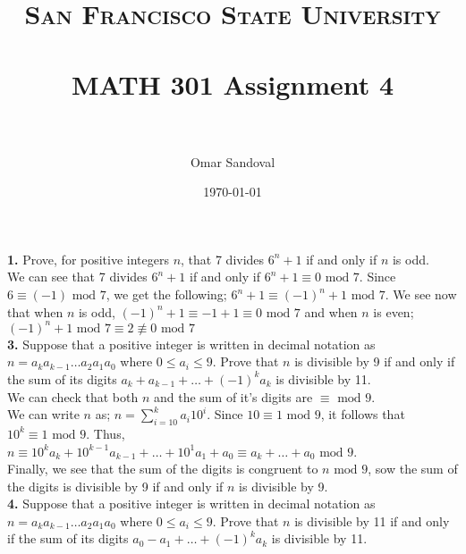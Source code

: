 \documentclass[paper=letter, fontsize=11pt]{scrartcl} %
\title{	
\normalfont \normalsize 
\textsc{San Francisco State University} \\ [25pt]
\horrule{0.5pt} \\[0.4cm] %
\huge MATH 301 Assignment 4  \\ %
\horrule{2pt} \\[0.5cm] %
}
\author{Omar Sandoval}
\date{\normalsize\today}
\begin{document}
\maketitle

\textbf{1.} Prove, for positive integers $n$, that 7 divides $6^n + 1$ if and only if $n$
is odd.
\\

We can see that 7 divides $6^n + 1$ if and only if $6^n + 1 \equiv 0 \text{ mod } 7$.
Since $6 \equiv (-1) \text{ mod } 7$, we get the following; $6^n + 1 \equiv (-1)^n + 1 \text{ mod } 7$.
We see now that when $n$ is odd, $(-1)^n + 1 \equiv -1 + 1 \equiv 0 \text{ mod } 7$ and when $n$
is even; $(-1)^n + 1 \text{ mod } 7 \equiv 2 \not\equiv 0 \text{ mod } 7$
\\

\textbf{3.} Suppose that a positive integer is written in decimal notation as 
$n=a_k a_{k-1} \dots a_2a_1a_0$ where $0 \le a_i \le 9$. Prove that $n$ is divisible by 
9 if and only if the sum of its digits $a_k + a_{k-1} + \dots + (-1)^k a_k$ is divisible 
by 11.
\\

We can check that both $n$ and the sum of it's digits are $\equiv \text{ mod } 9$. \\
We can write $n$ as; $n = \sum_{i=10}^k a_i 10^i$.
Since $10 \equiv 1 \text{ mod } 9$, it follows that $10^k \equiv 1 \text{ mod } 9$.
Thus, $n \equiv 10^ka_k + 10^{k-1} a_{k-1} + \dots + 10^1 a_1 + a_0 \equiv a_k + \dots 
+ a_0 \text{ mod } 9$.
\\
Finally, we see that the sum of the digits is congruent to $n \text{ mod } 9$, sow the 
sum of the digits is divisible by 9 if and only if $n$ is divisible by 9.
\\

\textbf{4.} Suppose that a positive integer is written in decimal notation as 
$n=a_k a_{k-1} \dots a_2a_1a_0$ where $0 \le a_i \le 9$. Prove that $n$ is divisible by 
11 if and only if the sum of its digits $a_0 - a_1 + \dots + (-1)^ka_k$ is divisible 
by 11.
\\
\end{document}
